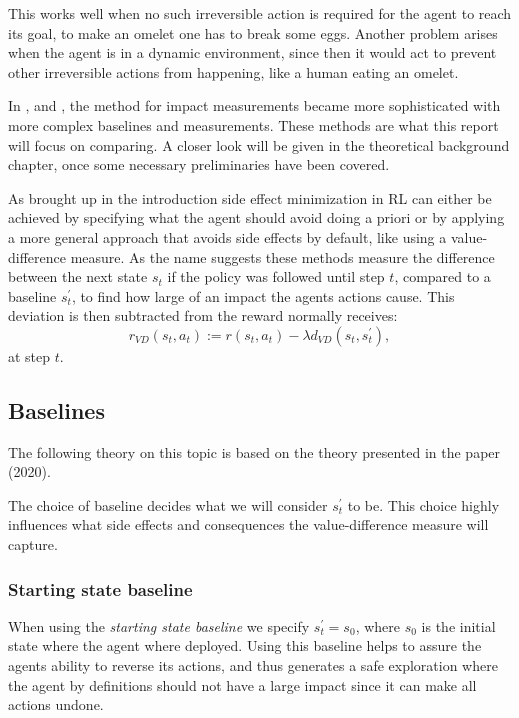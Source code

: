 \documentclass[12pt,A4]{report}
\theoremstyle{definition}
\begin{document}
This works well when no such irreversible action is required for the agent to reach its goal, to make an omelet one has to break some eggs. Another problem arises when the agent is in a dynamic environment, since then it would act to prevent other irreversible actions from happening, like a human eating an omelet. 

In \autocite{Krakovna et al 2019}, \autocite{Krakovna et al 2020} and \autocite{Turner et al 2020}, the method for impact measurements became more sophisticated with more complex baselines and measurements. These methods are what this report will focus on comparing. A closer look will be given in the theoretical background chapter, once some necessary preliminaries have been covered.

As brought up in the introduction side effect minimization in RL can either be achieved by specifying what the agent should avoid doing a priori or by applying a more general approach that avoids side effects by default, like using a value-difference measure. As the name suggests these methods measure the difference between the next state $s_t$ if the policy was followed until step $t$, compared to a baseline $s_t^\prime$, to find how large of an impact the agents actions cause. This deviation is then subtracted from the reward normally receives:
\[ r_{VD}(s_t,a_t) := r(s_t,a_t) - \lambda d_{VD}(s_t, s_t^\prime), \]
at step $t$. 

\subsection{Baselines}
The following theory on this topic is based on the theory presented in the paper \autocite{Krakovna et al.}(2020).


The choice of baseline decides what we will consider $s^{\prime}_t$ to be. This choice highly influences what side effects and consequences the value-difference measure will capture.

\subsubsection{Starting state baseline}
When using the \textit{starting state baseline} we specify $s^{\prime}_t = s_0$, where $s_0$ is the initial state where the agent where deployed. Using this baseline helps to assure the agents ability to reverse its actions, and thus generates a safe exploration where the agent by definitions should not have a large impact since it can make all actions undone. %
\end{document}
